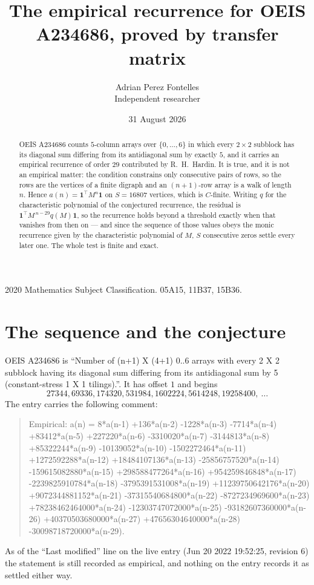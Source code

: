 \documentclass[11pt,a4paper]{article}
\title{The empirical recurrence for OEIS A234686, proved by transfer matrix}
\author{Adrian Perez Fontelles\\ \small Independent researcher}
\date{31 August 2026}
\theoremstyle{plain}
\theoremstyle{definition}
\begin{document}
\maketitle

\begin{abstract}
OEIS A234686 counts $5$-column arrays over $\{0,\dots,6\}$ in which every
$2\times2$ subblock has its diagonal sum differing from its antidiagonal sum by
exactly $5$, and it
carries an empirical recurrence of order $29$ contributed by R.~H.~Hardin. It is true,
and it is not an empirical matter: the condition constrains only consecutive pairs of rows,
so the rows are the vertices of a finite digraph and an $(n+1)$-row array is a walk of
length $n$. Hence $a(n)=\mathbf{1}^{\!\top}M^{n}\mathbf{1}$ on $S=16807$ vertices, which
is $C$-finite. Writing $q$ for the characteristic polynomial of the conjectured recurrence,
the residual is $\mathbf{1}^{\!\top}M^{\,n-29}q(M)\mathbf{1}$, so the recurrence
holds beyond a threshold exactly when that vanishes from then on --- and since the sequence
of those values obeys the monic recurrence given by the characteristic polynomial of $M$,
$S$ consecutive zeros settle every later one. The whole test is finite and exact.
\end{abstract}

\noindent\small 2020 Mathematics Subject Classification. 05A15, 11B37, 15B36.\normalsize

\section{The sequence and the conjecture}

OEIS A234686 is ``Number of (n+1) X (4+1) 0..6 arrays with every 2 X 2 subblock having its diagonal sum differing from its antidiagonal sum by 5 (constant-stress 1 X 1 tilings).''. It has offset
$1$ and begins
\[
27344, 69336, 174320, 531984, 1602224, 5614248, 19258400,\ \dots
\]
The entry carries the following comment:
\begin{quote}\small
Empirical: a(n) = 8*a(n-1) +136*a(n-2) -1228*a(n-3) -7714*a(n-4) +83412*a(n-5) +227220*a(n-6) -3310020*a(n-7) -3144813*a(n-8) +85322244*a(n-9) -10139052*a(n-10) -1502272464*a(n-11) +1272592288*a(n-12) +18484107136*a(n-13) -25856757520*a(n-14) -159615082880*a(n-15) +298588477264*a(n-16) +954259846848*a(n-17) -2239825910784*a(n-18) -3795391531008*a(n-19) +11239750642176*a(n-20) +9072344881152*a(n-21) -37315540684800*a(n-22) -8727234969600*a(n-23) +78238462464000*a(n-24) -12303747072000*a(n-25) -93182607360000*a(n-26) +40370503680000*a(n-27) +47656304640000*a(n-28) -30098718720000*a(n-29).
\end{quote}
As of the ``Last modified'' line on the live entry (Jun 20 2022 19:52:25, revision 6) the statement is
still recorded as empirical, and nothing on the entry records it as settled either way.
\end{document}
